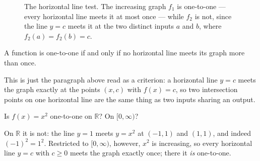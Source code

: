 \begin{figure}[H]
\centering
{}
\hspace{1.2cm}
\caption{The horizontal line test. The increasing graph \(f_{1}\) is one-to-one --- every horizontal line meets it at most once --- while \(f_{2}\) is not, since the line \(y = c\) meets it at the two distinct inputs \(a\) and \(b\), where \(f_{2}(a) = f_{2}(b) = c\).}
\label{fig:horizontal-line-test}
\end{figure}

\begin{proposition}\label{prop:horizontal-line-test}
A function is one-to-one if and only if no horizontal line meets its graph more than once.
\end{proposition}

This is just the paragraph above read as a criterion: a horizontal line \(y = c\) meets the graph exactly at the points \((x, c)\) with \(f(x) = c\), so two intersection points on one horizontal line are the same thing as two inputs sharing an output.

\begin{workedexample}
\begin{example}\label{ex:diagnose-one-to-one}
Is \(f(x) = x^{2}\) one-to-one on \(\mathbb{R}\)? On \([0, \infty)\)?
\end{example}

\begin{solution}
On \(\mathbb{R}\) it is not: the line \(y = 1\) meets \(y = x^{2}\) at \((-1, 1)\) and \((1, 1)\), and indeed \((-1)^{2} = 1^{2}\). Restricted to \([0, \infty)\), however, \(x^{2}\) is increasing, so every horizontal line \(y = c\) with \(c \ge 0\) meets the graph exactly once; there it \emph{is} one-to-one.
\end{solution}
\end{workedexample}

